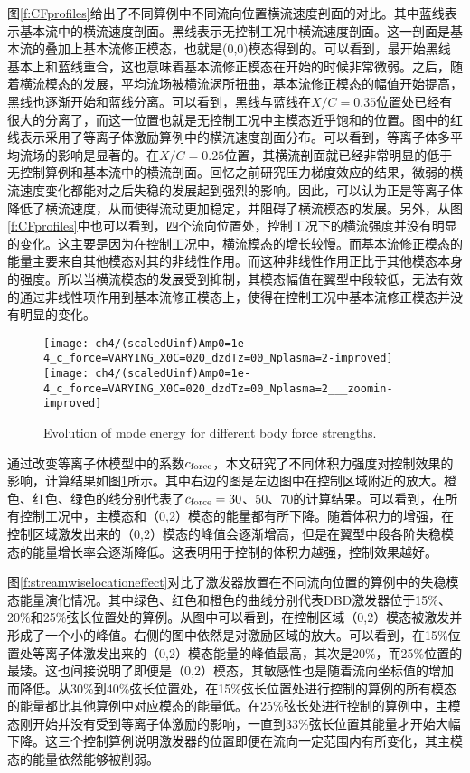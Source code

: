 图\ref{f:CFprofiles}给出了不同算例中不同流向位置横流速度剖面的对比。其中蓝线表示基本流中的横流速度剖面。黑线表示无控制工况中横流速度剖面。这一剖面是基本流的叠加上基本流修正模态，也就是(0,0)模态得到的。可以看到，最开始黑线基本上和蓝线重合，这也意味着基本流修正模态在开始的时候非常微弱。之后，随着横流模态的发展，平均流场被横流涡所扭曲，基本流修正模态的幅值开始提高，黑线也逐渐开始和蓝线分离。可以看到，黑线与蓝线在$X/C=0.35$位置处已经有很大的分离了，而这一位置也就是无控制工况中主模态近乎饱和的位置。图中的红线表示采用了等离子体激励算例中的横流速度剖面分布。可以看到，等离子体多平均流场的影响是显著的。在$X/C=0.25$位置，其横流剖面就已经非常明显的低于无控制算例和基本流中的横流剖面。回忆之前研究压力梯度效应的结果，微弱的横流速度变化都能对之后失稳的发展起到强烈的影响。因此，可以认为正是等离子体降低了横流速度，从而使得流动更加稳定，并阻碍了横流模态的发展。另外，从图\ref{f:CFprofiles}中也可以看到，四个流向位置处，控制工况下的横流强度并没有明显的变化。这主要是因为在控制工况中，横流模态的增长较慢。而基本流修正模态的能量主要来自其他模态对其的非线性作用。而这种非线性作用正比于其他模态本身的强度。所以当横流模态的发展受到抑制，其模态幅值在翼型中段较低，无法有效的通过非线性项作用到基本流修正模态上，使得在控制工况中基本流修正模态并没有明显的变化。
\begin{figure}
\centering
\texttt{[image: ch4/(scaledUinf)Amp0=1e-4\_c\_force=VARYING\_X0C=020\_dzdTz=00\_Nplasma=2-improved]}
\texttt{[image: ch4/(scaledUinf)Amp0=1e-4\_c\_force=VARYING\_X0C=020\_dzdTz=00\_Nplasma=2\_\_\_zoomin-improved]}
\caption{Evolution of mode energy for different body force strengths.}%
\label{f:forcestrength}
\end{figure}

通过改变等离子体模型中的系数$c_{\rm force}$，本文研究了不同体积力强度对控制效果的影响，计算结果如图\ref{f:forcestrength}所示。其中右边的图是左边图中在控制区域附近的放大。橙色、红色、绿色的线分别代表了$c_{\rm force}=30$、50、70的计算结果。可以看到，在所有控制工况中，主模态和（0,2）模态的能量都有所下降。随着体积力的增强，在控制区域激发出来的（0,2）模态的峰值会逐渐增高，但是在翼型中段各阶失稳模态的能量增长率会逐渐降低。这表明用于控制的体积力越强，控制效果越好。

图\ref{f:streamwiselocationeffect}对比了激发器放置在不同流向位置的算例中的失稳模态能量演化情况。其中绿色、红色和橙色的曲线分别代表DBD激发器位于15\%、20\%和25\%弦长位置处的算例。从图中可以看到，在控制区域（0,2）模态被激发并形成了一个小的峰值。右侧的图中依然是对激励区域的放大。可以看到，在15\%位置处等离子体激发出来的（0,2）模态能量的峰值最高，其次是20\%，而25\%位置的最矮。这也间接说明了即便是（0,2）模态，其敏感性也是随着流向坐标值的增加而降低。从30\%到40\%弦长位置处，在15\%弦长位置处进行控制的算例的所有模态的能量都比其他算例中对应模态的能量低。在25\%弦长处进行控制的算例中，主模态刚开始并没有受到等离子体激励的影响，一直到33\%弦长位置其能量才开始大幅下降。这三个控制算例说明激发器的位置即便在流向一定范围内有所变化，其主模态的能量依然能够被削弱。

